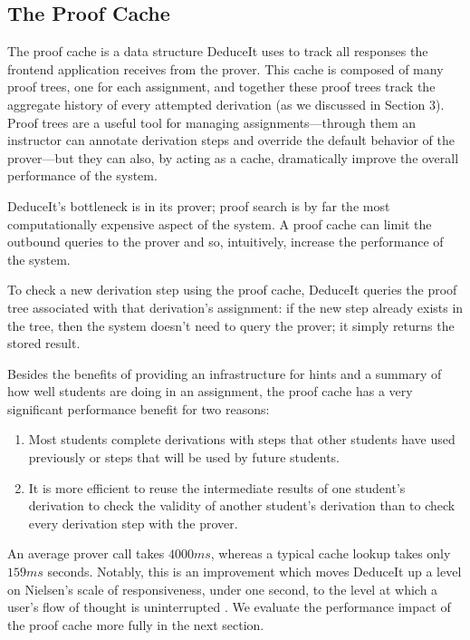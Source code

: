 \documentclass{sigchi}
\newcommand{\msb}[1]{\textbf{\textcolor{cyan}{Michael: #1}}}
\begin{document}
\subsection{The Proof Cache}

The proof cache is a data structure DeduceIt uses to track all responses the frontend application receives from the prover. This cache is composed of many proof trees, one for each assignment, and together these proof trees track the aggregate history of every attempted derivation (as we discussed in Section 3). Proof trees are a useful tool for managing assignments---through them an instructor can annotate derivation steps and override the default behavior of the prover---but they can also, by acting as a cache, dramatically improve the overall performance of the system. 

DeduceIt's bottleneck is in its prover; proof search is by far the most computationally expensive aspect of the system. A proof cache can limit the outbound queries to the prover and so, intuitively, increase the performance of the system. 

To check a new derivation step using the proof cache, DeduceIt queries the proof tree associated with that derivation's assignment: if the new step already exists in the tree, then the system doesn't need to query the prover; it simply returns the stored result. %

Besides the benefits of providing an infrastructure for hints and a summary of how well students are doing in an assignment, the proof cache has a very significant performance benefit for two reasons:
\begin{enumerate}
  \item Most students complete derivations with steps that other students have used previously or steps that will be used by future students.
  \item It is more efficient to reuse the intermediate results of one student's derivation to check the validity of another student's derivation than to check every derivation step with the prover. \label{hyp:2}
\end{enumerate}  
An average prover call takes $4000ms$, whereas a typical cache lookup takes only $159ms$ seconds. Notably, this is an improvement which moves DeduceIt up a level on Nielsen's scale of responsiveness, under one second, to the level at which a user's flow of thought is uninterrupted \cite{neilsen}. We evaluate the performance impact of the proof cache more fully in the next section.
\end{document}
